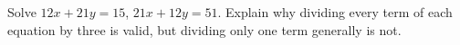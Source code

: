 Solve $12x+21y=15$, $21x+12y=51$. Explain why dividing every term of each equation by three is valid, but dividing only one term generally is not.

